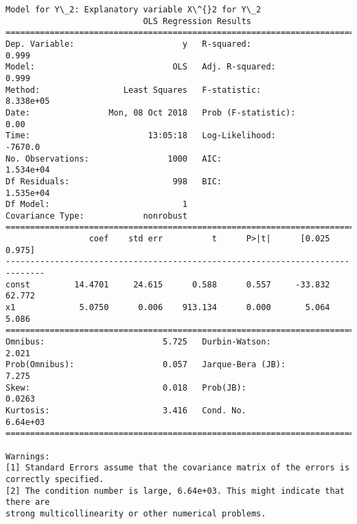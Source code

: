 \documentclass[11pt]{article}
\begin{document}
\begin{Verbatim}[commandchars=\\\{\}]
Model for Y\_2: Explanatory variable X\^{}2 for Y\_2
                            OLS Regression Results                            
==============================================================================
Dep. Variable:                      y   R-squared:                       0.999
Model:                            OLS   Adj. R-squared:                  0.999
Method:                 Least Squares   F-statistic:                 8.338e+05
Date:                Mon, 08 Oct 2018   Prob (F-statistic):               0.00
Time:                        13:05:18   Log-Likelihood:                -7670.0
No. Observations:                1000   AIC:                         1.534e+04
Df Residuals:                     998   BIC:                         1.535e+04
Df Model:                           1                                         
Covariance Type:            nonrobust                                         
==============================================================================
                 coef    std err          t      P>|t|      [0.025      0.975]
------------------------------------------------------------------------------
const         14.4701     24.615      0.588      0.557     -33.832      62.772
x1             5.0750      0.006    913.134      0.000       5.064       5.086
==============================================================================
Omnibus:                        5.725   Durbin-Watson:                   2.021
Prob(Omnibus):                  0.057   Jarque-Bera (JB):                7.275
Skew:                           0.018   Prob(JB):                       0.0263
Kurtosis:                       3.416   Cond. No.                     6.64e+03
==============================================================================

Warnings:
[1] Standard Errors assume that the covariance matrix of the errors is correctly specified.
[2] The condition number is large, 6.64e+03. This might indicate that there are
strong multicollinearity or other numerical problems.



\end{Verbatim}
\end{document}
